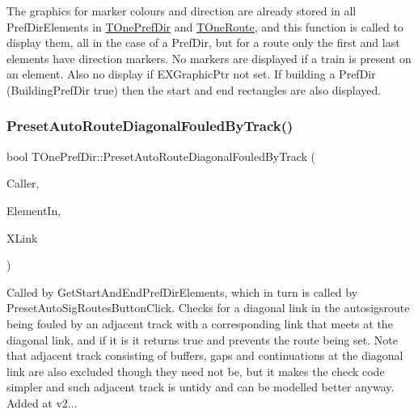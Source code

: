 The graphics for marker colours and direction are already stored in all Pref\+Dir\+Elements in \mbox{\hyperlink{class_t_one_pref_dir}{T\+One\+Pref\+Dir}} and \mbox{\hyperlink{class_t_one_route}{T\+One\+Route}}, and this function is called to display them, all in the case of a Pref\+Dir, but for a route only the first and last elements have direction markers. No markers are displayed if a train is present on an element. Also no display if E\+X\+Graphic\+Ptr not set. If building a Pref\+Dir (Building\+Pref\+Dir true) then the start and end rectangles are also displayed. \mbox{\label{class_t_one_pref_dir_ae0e03d494164fe961da51b0be8492934}} 
\subsubsection{\texorpdfstring{Preset\+Auto\+Route\+Diagonal\+Fouled\+By\+Track()}{PresetAutoRouteDiagonalFouledByTrack()}}
{\footnotesize\ttfamily bool T\+One\+Pref\+Dir\+::\+Preset\+Auto\+Route\+Diagonal\+Fouled\+By\+Track (\begin{DoxyParamCaption}\item[{int}]{Caller,  }\item[{\mbox{\hyperlink{class_t_pref_dir_element}{T\+Pref\+Dir\+Element}}}]{Element\+In,  }\item[{int}]{X\+Link }\end{DoxyParamCaption})\hspace{0.3cm}{\ttfamily [protected]}}

Called by Get\+Start\+And\+End\+Pref\+Dir\+Elements, which in turn is called by Preset\+Auto\+Sig\+Routes\+Button\+Click. Checks for a diagonal link in the autosigsroute being fouled by an adjacent track with a corresponding link that meets at the diagonal link, and if it is it returns true and prevents the route being set. Note that adjacent track consisting of buffers, gaps and continuations at the diagonal link are also excluded though they need not be, but it makes the check code simpler and such adjacent track is untidy and can be modelled better anyway. Added at v2... \mbox{\label{class_t_one_pref_dir_ab35c683ba0ec156d19d4db991046b7d2}} 
